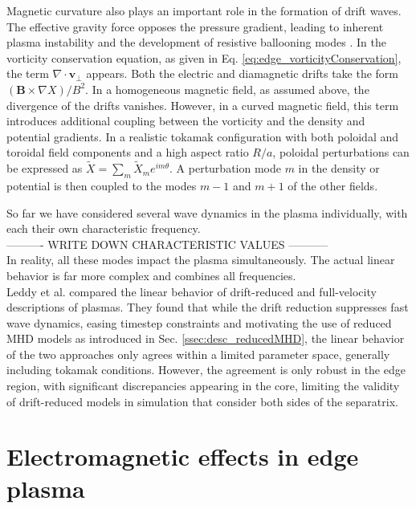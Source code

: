 Magnetic curvature also plays an important role in the formation of drift waves. The effective gravity force opposes the pressure gradient, leading to inherent plasma instability and the development of resistive ballooning modes \cite{hastie2003drift}. In the vorticity conservation equation, as given in Eq. \ref{eq:edge_vorticityConservation}, the term $ \nabla \cdot \mathbf{v}_\perp $ appears. Both the electric and diamagnetic drifts take the form $ ( \mathbf{B} \times \nabla X)/B^2 $. In a homogeneous magnetic field, as assumed above, the divergence of the drifts vanishes. However, in a curved magnetic field, this term introduces additional coupling between the vorticity and the density and potential gradients. In a realistic tokamak configuration with both poloidal and toroidal field components and a high aspect ratio $ R/a $, poloidal perturbations can be expressed as $ \tilde{X} = \sum_m \tilde{X}_m e^{im\theta} $. A perturbation mode $ m $ in the density or potential is then coupled to the modes $ m-1 $ and $ m+1 $ of the other fields. \newline 


So far we have considered several wave dynamics in the plasma individually, with each their own characteristic frequency.  \\
---------- WRITE DOWN CHARACTERISTIC VALUES -----------  \\
In reality, all these modes impact the plasma simultaneously. The actual linear behavior is far more complex and combines all frequencies. \\

Leddy et al. \cite{leddy2015validity} compared the linear behavior of drift-reduced and full-velocity descriptions of plasmas. They found that while the drift reduction suppresses fast wave dynamics, easing timestep constraints and motivating the use of reduced MHD models as introduced in Sec. \ref{ssec:desc_reducedMHD}, the linear behavior of the two approaches only agrees within a limited parameter space, generally including tokamak conditions. However, the agreement is only robust in the edge region, with significant discrepancies appearing in the core, limiting the validity of drift-reduced models in simulation that consider both sides of the separatrix.




\section{Electromagnetic effects in edge plasma}
\label{sec:edge_EMeffects}

